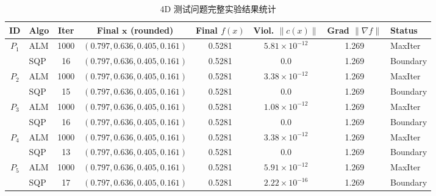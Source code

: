 \documentclass[a4paper,12pt]{article}
\begin{document}
\begin{table}[H]
    \centering
    \caption{4D 测试问题完整实验结果统计}
    \label{tab:full_results_4d}
    \scriptsize 
    \setlength{\tabcolsep}{3pt} 
    \begin{tabular}{clc c ccc l}
        \toprule
        \textbf{ID} & \textbf{Algo} & \textbf{Iter} & \textbf{Final } $\mathbf{x}$ {\tiny (rounded)} & \textbf{Final } $f(x)$ & \textbf{Viol.} $\|c(x)\|$ & \textbf{Grad} $\|\nabla f\|$ & \textbf{Status} \\
        \midrule
        
        \multirow{2}{*}{$P_1$} 
        & ALM & 1000 & $(0.797, 0.636, 0.405, 0.161)$ & 0.5281 & $5.81 \times 10^{-12}$ & 1.269 & MaxIter \\
        & SQP & 16   & $(0.797, 0.636, 0.405, 0.161)$ & 0.5281 & 0.0 & 1.269 & Boundary \\ \cmidrule{1-8}

        \multirow{2}{*}{$P_2$} 
        & ALM & 1000 & $(0.797, 0.636, 0.405, 0.161)$ & 0.5281 & $3.38 \times 10^{-12}$ & 1.269 & MaxIter \\
        & SQP & 15   & $(0.797, 0.636, 0.405, 0.161)$ & 0.5281 & 0.0 & 1.269 & Boundary \\ \cmidrule{1-8}

        \multirow{2}{*}{$P_3$} 
        & ALM & 1000 & $(0.797, 0.636, 0.405, 0.161)$ & 0.5281 & $1.08 \times 10^{-12}$ & 1.269 & MaxIter \\
        & SQP & 16   & $(0.797, 0.636, 0.405, 0.161)$ & 0.5281 & 0.0 & 1.269 & Boundary \\ \cmidrule{1-8}

        \multirow{2}{*}{$P_4$} 
        & ALM & 1000 & $(0.797, 0.636, 0.405, 0.161)$ & 0.5281 & $3.38 \times 10^{-12}$ & 1.269 & MaxIter \\
        & SQP & 13   & $(0.797, 0.636, 0.405, 0.161)$ & 0.5281 & 0.0 & 1.269 & Boundary \\ \cmidrule{1-8}

        \multirow{2}{*}{$P_5$} 
        & ALM & 1000 & $(0.797, 0.636, 0.405, 0.161)$ & 0.5281 & $5.91 \times 10^{-12}$ & 1.269 & MaxIter \\
        & SQP & 17   & $(0.797, 0.636, 0.405, 0.161)$ & 0.5281 & $2.22 \times 10^{-16}$ & 1.269 & Boundary \\ \cmidrule{1-8}


\end{tabular}
\end{table}
\end{document}
